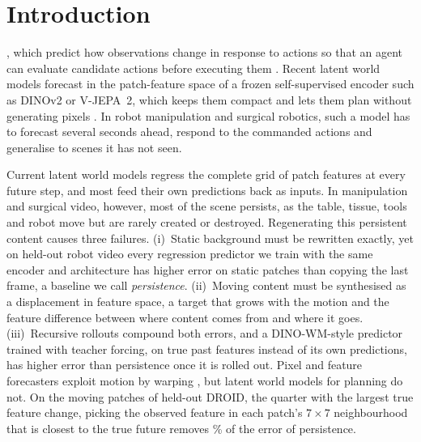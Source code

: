 \section{Introduction}
\label{sec:intro}

, which predict how observations change in response to actions so that an agent can
evaluate candidate actions before executing them \citep{hafner2019planet}.
%
Recent latent world models forecast in the patch-feature space of a frozen self-supervised encoder such as DINOv2 or
V-JEPA~2, which keeps them compact and lets them plan without generating pixels
\citep{zhou2025dinowm,assran2025vjepa2,maes2026lewm,sobal2025pldm}.
%
In robot manipulation and surgical robotics, such a model has to forecast several seconds ahead, respond to the
commanded actions and generalise to scenes it has not seen.

Current latent world models regress the complete grid of patch features at every future step, and most feed their own
predictions back as inputs.
%
In manipulation and surgical video, however, most of the scene persists, as the table, tissue, tools and robot move but
are rarely created or destroyed.
%
Regenerating this persistent content causes three failures.
%
(i)~Static background must be rewritten exactly, yet on held-out robot video every regression predictor we train with the
same encoder and architecture has higher error on static patches than copying the last frame, a baseline we call \emph{persistence}.
%
(ii)~Moving content must be synthesised as a displacement in feature space, a target that grows with the motion and
the feature difference between where content comes from and where it goes.
%
(iii)~Recursive rollouts compound both errors, and a DINO-WM-style predictor trained with teacher forcing, on true past features instead of its own predictions, has
higher error than persistence once it is rolled out.
%
Pixel and feature forecasters exploit motion by warping \citep{finn2016advection,liu2017voxelflow,saric2020warp}, but
latent world models for planning do not.
%
%
On the moving patches of held-out DROID, the quarter with the largest true feature change, picking the observed
feature in each patch's $7{\times}7$ neighbourhood that is closest to the true future removes \geoOracleRed\% of the
error of persistence.

